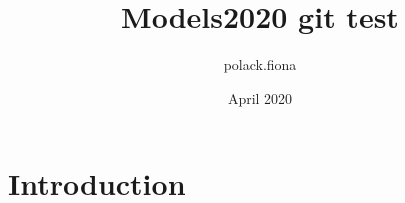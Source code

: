 \documentclass{article}
\title{Models2020 git test}
\author{polack.fiona }
\date{April 2020}
\begin{document}
\maketitle

\section{Introduction}
\end{document}
